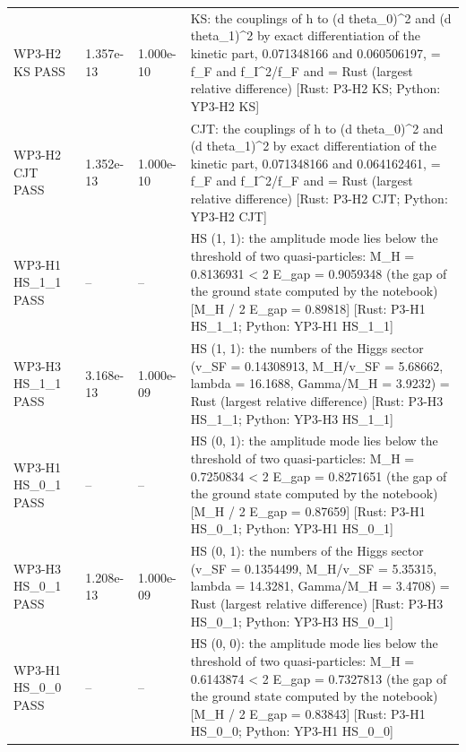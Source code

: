\documentclass[aps,prd,onecolumn,superscriptaddress,nofootinbib,floatfix,longbibliography]{revtex4-2}
\begin{document}
\begin{longtable}{p{}p{}p{}p{}}
WP3-H2 KS \newline PASS & 1.357e-13 & 1.000e-10 & KS: the couplings of h to (d theta\_0)\textasciicircum{}2 and (d theta\_1)\textasciicircum{}2 by exact differentiation of the kinetic part, 0.071348166 and 0.060506197, = f\_F and f\_I\textasciicircum{}2/f\_F and = Rust (largest relative difference) [Rust: P3-H2 KS; Python: YP3-H2 KS] \\
WP3-H2 CJT \newline PASS & 1.352e-13 & 1.000e-10 & CJT: the couplings of h to (d theta\_0)\textasciicircum{}2 and (d theta\_1)\textasciicircum{}2 by exact differentiation of the kinetic part, 0.071348166 and 0.064162461, = f\_F and f\_I\textasciicircum{}2/f\_F and = Rust (largest relative difference) [Rust: P3-H2 CJT; Python: YP3-H2 CJT] \\
WP3-H1 HS\_1\_1 \newline PASS & -- & -- & HS (1, 1): the amplitude mode lies below the threshold of two quasi-particles: M\_H = 0.8136931 \textless{} 2 E\_gap = 0.9059348 (the gap of the ground state computed by the notebook) [M\_H / 2 E\_gap = 0.89818] [Rust: P3-H1 HS\_1\_1; Python: YP3-H1 HS\_1\_1] \\
WP3-H3 HS\_1\_1 \newline PASS & 3.168e-13 & 1.000e-09 & HS (1, 1): the numbers of the Higgs sector (v\_SF = 0.14308913, M\_H/v\_SF = 5.68662, lambda = 16.1688, Gamma/M\_H = 3.9232) = Rust (largest relative difference) [Rust: P3-H3 HS\_1\_1; Python: YP3-H3 HS\_1\_1] \\
WP3-H1 HS\_0\_1 \newline PASS & -- & -- & HS (0, 1): the amplitude mode lies below the threshold of two quasi-particles: M\_H = 0.7250834 \textless{} 2 E\_gap = 0.8271651 (the gap of the ground state computed by the notebook) [M\_H / 2 E\_gap = 0.87659] [Rust: P3-H1 HS\_0\_1; Python: YP3-H1 HS\_0\_1] \\
WP3-H3 HS\_0\_1 \newline PASS & 1.208e-13 & 1.000e-09 & HS (0, 1): the numbers of the Higgs sector (v\_SF = 0.1354499, M\_H/v\_SF = 5.35315, lambda = 14.3281, Gamma/M\_H = 3.4708) = Rust (largest relative difference) [Rust: P3-H3 HS\_0\_1; Python: YP3-H3 HS\_0\_1] \\
WP3-H1 HS\_0\_0 \newline PASS & -- & -- & HS (0, 0): the amplitude mode lies below the threshold of two quasi-particles: M\_H = 0.6143874 \textless{} 2 E\_gap = 0.7327813 (the gap of the ground state computed by the notebook) [M\_H / 2 E\_gap = 0.83843] [Rust: P3-H1 HS\_0\_0; Python: YP3-H1 HS\_0\_0] \\

\end{longtable}
\end{document}
